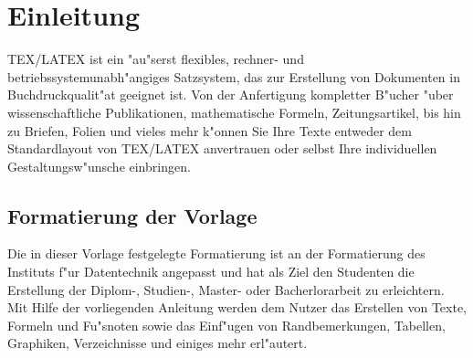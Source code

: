 \chapter{Einleitung}
\label{cha:einleitung}

TEX/LATEX ist ein "au"serst flexibles, rechner- und betriebssystemunabh"angiges Satzsystem, das zur 
Erstellung von Dokumenten in Buchdruckqualit"at geeignet ist. Von der Anfertigung kompletter 
B"ucher "uber wissenschaftliche Publikationen, mathematische Formeln, Zeitungsartikel, bis hin 
zu Briefen, Folien und vieles mehr k"onnen Sie Ihre Texte entweder dem Standardlayout von 
TEX/LATEX anvertrauen oder selbst Ihre individuellen Gestaltungsw"unsche einbringen.  

\section{Formatierung der Vorlage}
\label{sec:formatierung}


Die in dieser Vorlage festgelegte Formatierung ist an der Formatierung des Instituts f"ur Datentechnik angepasst 
und hat als Ziel den Studenten die Erstellung der Diplom-, Studien-, Master- oder Bacherlorarbeit zu erleichtern.
Mit Hilfe der vorliegenden Anleitung werden dem Nutzer das Erstellen von Texte, Formeln und Fu"snoten sowie das Einf"ugen von Randbemerkungen, Tabellen, Graphiken, Verzeichnisse und einiges mehr erl"autert. 


